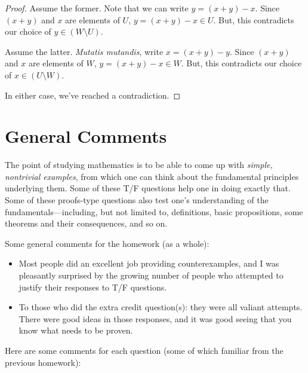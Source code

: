 \documentclass{amsart}
\theoremstyle{definition}
\theoremstyle{definition}
\DeclareMathOperator{\1}{\mathbbm{1}}
\begin{document}
\begin{enumerate}
\begin{proof}
			Assume the former. Note that we can write $y = (x+y) - x$. Since $(x+y)$ and $x$ are elements of $U$, $y = (x+y) - x \in U$. But, this contradicts our choice of $y \in (W \setminus U)$.
			
			Assume the latter. \textit{Mutatis mutandis}, write $x = (x+y) - y$. Since $(x+y)$ and $x$ are elements of $W$, $y = (x+y) - x \in W$. But, this contradicts our choice of $x \in (U \setminus W)$.
			
			In either case, we've reached a contradiction. 
		\end{proof}
		
	\end{enumerate}
	
	
	\clearpage
	
	
\section*{General Comments}


The point of studying mathematics is to be able to come up with \textit{simple, nontrivial examples}, from which one can think about the fundamental principles underlying them. Some of these T/F questions help one in doing exactly that. Some of these proofs-type questions also test one's understanding of the fundamentals---including, but not limited to, definitions, basic propositions, some theorems and their consequences, and so on.

Some general comments for the homework (as a whole):
\begin{itemize}
	\item Most people did an excellent job providing counterexamples, and I was pleasantly surprised by the growing number of people who attempted to justify their responses to T/F questions.
	
	\item To those who did the extra credit question(s): they were all valiant attempts. There were good ideas in those responses, and it was good seeing that you know what needs to be proven.
\end{itemize}

\noindent Here are some comments for each question (some of which familiar from the previous homework):

\bigskip
\end{document}
